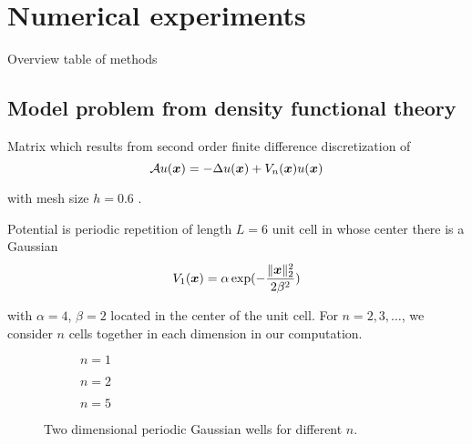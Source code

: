 \chapter{Numerical experiments}
\label{chp:5-experiments}

Overview table of methods

\section{Model problem from density functional theory}
\label{sec:5-experiments-density-function}

Matrix which results from second order finite difference discretization of
\begin{equation}
    \mathcal{A} u(\boldsymbol{x}) = - \Delta u(\boldsymbol{x}) + V_n(\boldsymbol{x}) u(\boldsymbol{x})
    \label{equ:5-experiments-electronic-hamiltonian}
\end{equation}

with mesh size $h=0.6$ \cite{lin2017randomized}.

Potential is periodic repetition of length $L=6$ unit cell in whose
center there is a Gaussian
\begin{equation}
    V_1(\boldsymbol{x}) = \alpha \exp(-\frac{\lVert \boldsymbol{x} \rVert_2^2}{ 2 \beta^2 })
\end{equation}

with $\alpha = 4$, $\beta = 2$ located in the center of the unit cell. For $n=2, 3, \dots$,
we consider $n$ cells together in each dimension in our computation.

\begin{figure}[ht]
    \begin{subfigure}[b]{0.33\columnwidth}
        
        \caption{$n=1$}
        \label{fig:5-experiments-periodic-gaussian-well-1}
    \end{subfigure}
    \begin{subfigure}[b]{0.33\columnwidth}
        
        \caption{$n=2$}
        \label{fig:5-experiments-periodic-gaussian-well-2}
    \end{subfigure}
    \begin{subfigure}[b]{0.33\columnwidth}
        
        \caption{$n=5$}
        \label{fig:5-experiments-periodic-gaussian-well-5}
    \end{subfigure}
    \caption{Two dimensional periodic Gaussian wells for different $n$.}
    \label{fig:5-experiments-periodic-gaussian-well}
\end{figure}


